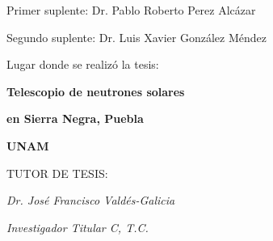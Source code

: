 \begin{titlepage}
	\large Primer suplente: Dr. Pablo Roberto Perez Alcázar
	
	\large Segundo suplente: Dr. Luis Xavier González Méndez
	
	\vspace*{35pt}
	\large Lugar donde se realizó la tesis:
	
	\vspace*{15pt}
	\textbf{\large Telescopio de neutrones solares}
	
	\textbf{\large en Sierra Negra, Puebla}
	
	\textbf{\large UNAM}
	\vspace*{35pt}

\begin{center}

	\Large TUTOR DE TESIS:
	
	\vspace*{35pt}
	\large \textit{Dr. José Francisco Valdés-Galicia}
	
	\large \textit{Investigador Titular C, T.C.}

\end{center}

\end{titlepage}
